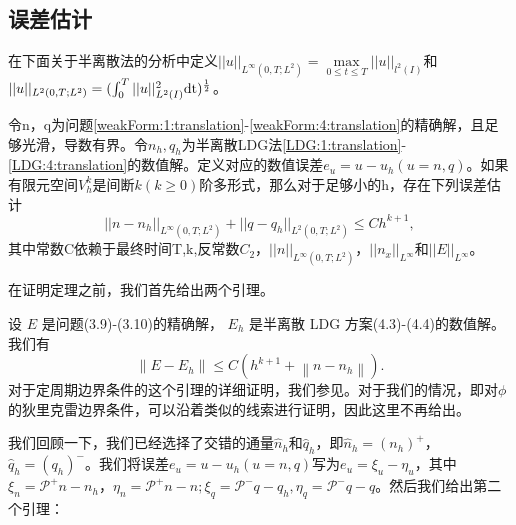 \subsection{误差估计}
在下面关于半离散法的分析中定义$||u||_{L^{\infty}(0,T;L^2)}  = \max \limits_{0 \leq t \leq T}||u||_{l^2(I)}$和$||u||_{L^2(0,T;L^2)} = (\int_{0}^{T}||u||_{L^2(I)}^2\rm{d}t)^{\frac{1}{2}}$。
\begin{theorem}
    令n，q为问题\eqref{weakForm:1:translation}-\eqref{weakForm:4:translation}的精确解，且足够光滑，导数有界。令$n_h,q_h$为半离散LDG法\eqref{LDG:1:translation}-\eqref{LDG:4:translation}的数值解。定义对应的数值误差$e_u = u - u_h (u = n,q)$。如果有限元空间$V_h^k$是间断$k(k\geq 0)$阶多形式，那么对于足够小的h，存在下列误差估计
    \begin{equation}
        ||n - n_h||_{L^{\infty}(0,T;L^2)} + ||q - q_h||_{L^2(0,T;L^2)} \leq C h^{k+1},
    \end{equation}
    其中常数C依赖于最终时间T,k,反常数$C_2$，$||n||_{L^{\infty}(0,T;L^2)}$，$||n_x||_{L^{\infty}}$和$||E||_{L^{\infty}}$。
\end{theorem}

在证明定理之前，我们首先给出两个引理。
\begin{lemma}
    设 $E$ 是问题(3.9)-(3.10)的精确解， $E_{h}$ 是半离散 LDG 方案(4.3)-(4.4)的数值解。我们有
    \begin{equation}
        \left\|E-E_{h}\right\| \leq C\left(h^{k+1}+\left\|n-n_{h}\right\|\right).
    \end{equation}
    对于定周期边界条件的这个引理的详细证明，我们参见\parencite{ayuso2011discontinuous}。对于我们的情况，即对$\phi$的狄里克雷边界条件，可以沿着类似的线索进行证明，因此这里不再给出。
\end{lemma}

我们回顾一下，我们已经选择了交错的通量$\hat{n}_{h}$和$\hat{q}_{h}$，即$\hat{n}_{h}=\left(n_{h}\right)^{+}$，$\hat{q}_{h}=\left(q_{h}\right)^{-}$。我们将误差$e_{u}=u-u_{h}(u=n, q)$写为$e_{u}=\xi_{u}-\eta_{u}$，其中$\xi_{n}=\mathcal{P}^{+} n-n_{h}$，$\eta_{n}=\mathcal{P}^{+} n-n ; \xi_{q}=\mathcal{P}^{-} q-q_{h}, \eta_{q}=\mathcal{P}^{-} q-q$。然后我们给出第二个引理：

